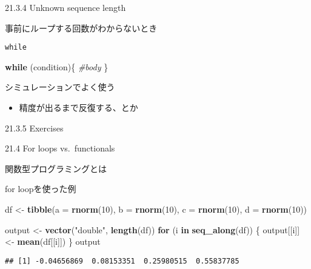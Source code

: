 \documentclass[ignorenonframetext,]{beamer}
\newenvironment{Shaded}{\begin{snugshade}}{\end{snugshade}}
\newcommand{\KeywordTok}[1]{\textcolor[rgb]{0.13,0.29,0.53}{\textbf{#1}}}
\newcommand{\DataTypeTok}[1]{\textcolor[rgb]{0.13,0.29,0.53}{#1}}
\newcommand{\DecValTok}[1]{\textcolor[rgb]{0.00,0.00,0.81}{#1}}
\newcommand{\StringTok}[1]{\textcolor[rgb]{0.31,0.60,0.02}{#1}}
\newcommand{\CommentTok}[1]{\textcolor[rgb]{0.56,0.35,0.01}{\textit{#1}}}
\newcommand{\ControlFlowTok}[1]{\textcolor[rgb]{0.13,0.29,0.53}{\textbf{#1}}}
\newcommand{\NormalTok}[1]{#1}
\providecommand{\tightlist}{%
  \setlength{\itemsep}{0pt}\setlength{\parskip}{0pt}}
\begin{document}
\begin{frame}{21.3.4 Unknown sequence length}

事前にループする回数がわからないとき

\end{frame}

\begin{frame}[fragile]{\texttt{while}}

\begin{Shaded}
\begin{Highlighting}[]
\ControlFlowTok{while}\NormalTok{ (condition)\{}
  \CommentTok{#body}
\NormalTok{\}}
\end{Highlighting}
\end{Shaded}

シミュレーションでよく使う

\begin{itemize}
\tightlist
\item
  精度が出るまで反復する、とか
\end{itemize}

\end{frame}

\begin{frame}{21.3.5 Exercises}

\end{frame}

\begin{frame}{21.4 For loops vs.~functionals}

関数型プログラミングとは

\end{frame}

\begin{frame}[fragile]{for loopを使った例}

\begin{Shaded}
\begin{Highlighting}[]
\NormalTok{df <-}\StringTok{ }\KeywordTok{tibble}\NormalTok{(}\DataTypeTok{a =} \KeywordTok{rnorm}\NormalTok{(}\DecValTok{10}\NormalTok{),}
         \DataTypeTok{b =} \KeywordTok{rnorm}\NormalTok{(}\DecValTok{10}\NormalTok{),}
         \DataTypeTok{c =} \KeywordTok{rnorm}\NormalTok{(}\DecValTok{10}\NormalTok{),}
         \DataTypeTok{d =} \KeywordTok{rnorm}\NormalTok{(}\DecValTok{10}\NormalTok{))}

\NormalTok{output <-}\StringTok{ }\KeywordTok{vector}\NormalTok{(}\StringTok{"double"}\NormalTok{, }\KeywordTok{length}\NormalTok{(df))}
\ControlFlowTok{for}\NormalTok{ (i }\ControlFlowTok{in} \KeywordTok{seq_along}\NormalTok{(df)) \{}
\NormalTok{    output[[i]] <-}\StringTok{ }\KeywordTok{mean}\NormalTok{(df[[i]])}
\NormalTok{\}}
\NormalTok{output}
\end{Highlighting}
\end{Shaded}

\begin{verbatim}
## [1] -0.04656869  0.08153351  0.25980515  0.55837785
\end{verbatim}

\end{frame}
\end{document}
